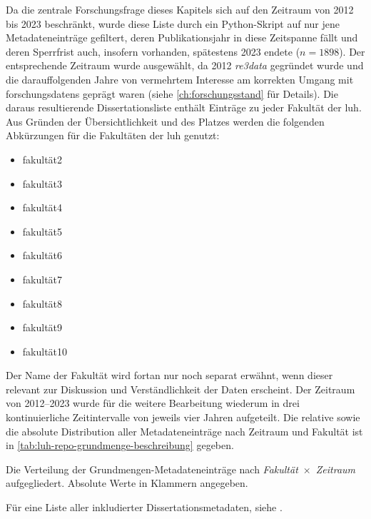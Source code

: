 Da die zentrale Forschungsfrage dieses Kapitels sich auf den Zeitraum von 2012 bis 2023 beschränkt, wurde diese Liste durch ein Python-Skript \autocite{my-dataset} auf nur jene Metadateneinträge gefiltert, deren Publikationsjahr in diese Zeitspanne fällt und deren Sperrfrist auch, insofern vorhanden, spätestens 2023 endete ($n=1898$).
Der entsprechende Zeitraum wurde ausgewählt, da 2012 \textit{re3data} gegründet wurde \autocite{Pampel2013} und die darauffolgenden Jahre von vermehrtem Interesse am korrekten Umgang mit \glspl{forschungsdaten} geprägt waren (siehe \cref{ch:forschungsstand} für Details).
Die daraus resultierende Dissertationsliste enthält Einträge zu jeder Fakultät der \gls{luh}.
Aus Gründen der Übersichtlichkeit und des Platzes werden die folgenden Abkürzungen für die Fakultäten der \gls{luh} genutzt:
\begin{itemize}
    \item \gls{fakultät2}
    \item \gls{fakultät3}
    \item \gls{fakultät4}
    \item \gls{fakultät5}
    \item \gls{fakultät6}
    \item \gls{fakultät7}
    \item \gls{fakultät8}
    \item \gls{fakultät9}
    \item \gls{fakultät10}
\end{itemize}
Der Name der Fakultät wird fortan nur noch separat erwähnt, wenn dieser relevant zur Diskussion und Verständlichkeit der Daten erscheint.
Der Zeitraum von 2012--2023 wurde für die weitere Bearbeitung wiederum in drei kontinuierliche Zeitintervalle von jeweils vier Jahren aufgeteilt.
Die relative sowie die absolute Distribution aller Metadateneinträge nach Zeitraum und Fakultät ist in \cref{tab:luh-repo-grundmenge-beschreibung} gegeben.
\begin{table}[!htbp]
	\caption{Die Verteilung der Grundmengen-Metadateneinträge nach \textit{Fakultät}~$\times$~\textit{Zeitraum} aufgegliedert.
    Absolute Werte in Klammern angegeben.}
    
	\label{tab:luh-repo-grundmenge-beschreibung}
\end{table}

\noindent Für eine Liste aller inkludierter Dissertationsmetadaten, siehe \autocite{my-dataset}.

